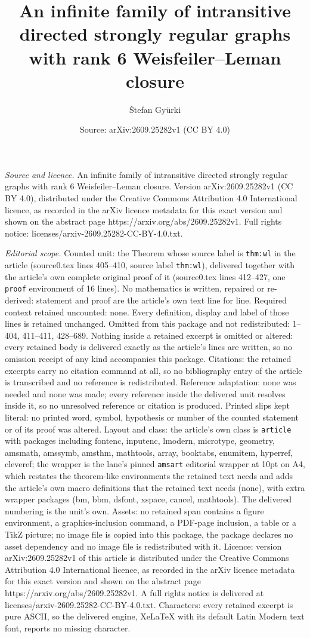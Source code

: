 \documentclass[10pt,a4paper]{amsart}
\title[An infinite family of intransitive directed strongly regular]{An infinite family of intransitive directed strongly regular graphs with rank 6 Weisfeiler--Leman closure}
\author{\v{S}tefan Gy\"urki}
\date{Source: arXiv:2609.25282v1 (CC BY 4.0)}
\begin{document}
\maketitle

\noindent\emph{Source and licence.} An infinite family of intransitive directed strongly regular graphs with rank 6 Weisfeiler--Leman closure. Version arXiv:2609.25282v1 (CC BY 4.0), distributed under the Creative Commons Attribution 4.0 International licence, as recorded in the arXiv licence metadata for this exact version and shown on the abstract page https://arxiv.org/abs/2609.25282v1. Full rights notice: licenses/arxiv-2609.25282-CC-BY-4.0.txt.\par\smallskip

\noindent\textit{Editorial scope.} Counted unit: the Theorem whose source label is \texttt{thm:wl} in the article (source0.tex lines 405--410, source label \texttt{thm:wl}), delivered together with the article's own complete original proof of it (source0.tex lines 412--427, one \texttt{proof} environment of 16 lines). No mathematics is written, repaired or re-derived: statement and proof are the article's own text line for line. Required context retained uncounted: none. Every definition, display and label of those lines is retained unchanged. Omitted from this package and not redistributed: 1--404, 411--411, 428--689. Nothing inside a retained excerpt is omitted or altered: every retained body is delivered exactly as the article's lines are written, so no omission receipt of any kind accompanies this package. Citations: the retained excerpts carry no citation command at all, so no bibliography entry of the article is transcribed and no reference is redistributed. Reference adaptation: none was needed and none was made; every reference inside the delivered unit resolves inside it, so no unresolved reference or citation is produced. Printed slips kept literal: no printed word, symbol, hypothesis or number of the counted statement or of its proof was altered. Layout and class: the article's own class is \texttt{article} with packages including fontenc, inputenc, lmodern, microtype, geometry, amsmath, amssymb, amsthm, mathtools, array, booktabs, enumitem, hyperref, cleveref; the wrapper is the lane's pinned \texttt{amsart} editorial wrapper at 10pt on A4, which restates the theorem-like environments the retained text needs and adds the article's own macro definitions that the retained text needs (none), with extra wrapper packages (bm, bbm, dsfont, xspace, cancel, mathtools). The delivered numbering is the unit's own. Assets: no retained span contains a figure environment, a graphics-inclusion command, a PDF-page inclusion, a table or a TikZ picture; no image file is copied into this package, the package declares no asset dependency and no image file is redistributed with it. Licence: version arXiv:2609.25282v1 of this article is distributed under the Creative Commons Attribution 4.0 International licence, as recorded in the arXiv licence metadata for this exact version and shown on the abstract page https://arxiv.org/abs/2609.25282v1. A full rights notice is delivered at licenses/arxiv-2609.25282-CC-BY-4.0.txt. Characters: every retained excerpt is pure ASCII, so the delivered engine, XeLaTeX with its default Latin Modern text font, reports no missing character.
\end{document}
